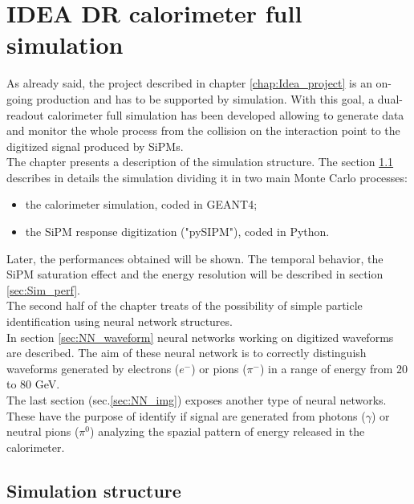 \chapter{IDEA DR calorimeter full simulation}
As already said, the project described in chapter \ref{chap:Idea_project} is an on-going production and has to be supported by simulation.
With this goal, a dual-readout calorimeter full simulation has been developed allowing to generate data and monitor the whole process from the collision on the interaction point to the digitized signal produced by SiPMs.\\

The chapter presents a description of the simulation structure. The section \ref{sec:Sim_struc} describes in details the simulation dividing it in two main Monte Carlo processes:
\begin{itemize}
	\item the calorimeter simulation, coded in GEANT4;
	\item the SiPM response digitization ("pySIPM"), coded in Python.
\end{itemize}

Later, the performances obtained will be shown. The temporal behavior, the SiPM saturation effect and the energy resolution will be described in section \ref{sec:Sim_perf}.\\

The second half of the chapter treats of the possibility of simple particle identification using neural network structures.\\
In section \ref{sec:NN_waveform} neural networks working on digitized waveforms are described. The aim of these neural network is to correctly distinguish waveforms generated by electrons ($e^-$) or pions ($\pi^-$) in a range of energy from $20$ to $80$ GeV.\\
The last section (sec.\ref{sec:NN_img})  exposes another type of neural networks. These have the purpose of identify if signal are generated from photons ($\gamma$) or neutral pions ($\pi^0$) analyzing the spazial pattern of energy released in the calorimeter.

\section{Simulation structure} \label{sec:Sim_struc}

